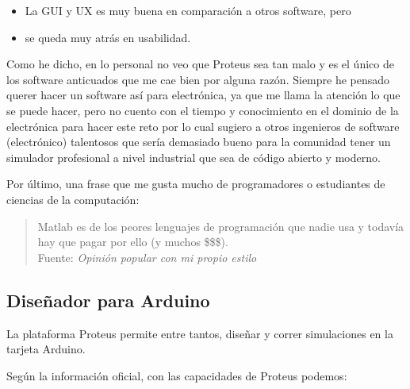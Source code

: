 \documentclass{article}
\begin{document}
\begin{itemize}
        \item La GUI y UX es muy buena en comparación a otros software, pero
        \item se queda muy atrás en usabilidad.
    \end{itemize}

    Como he dicho, en lo personal no veo que Proteus sea tan malo y es el
    único de los software anticuados que me cae bien por alguna razón.
    Siempre he pensado querer hacer un software así para electrónica, ya que
    me llama la atención lo que se puede hacer, pero no cuento con el tiempo y
    conocimiento en el dominio de la electrónica para hacer este reto por lo
    cual sugiero a otros ingenieros de software (electrónico) talentosos que
    sería demasiado bueno para la comunidad tener un simulador profesional a
    nivel industrial que sea de código abierto y moderno.

    \bigbreak

    Por último, una frase que me gusta mucho de programadores o estudiantes
    de ciencias de la computación:

    \begin{quote}
        Matlab es de los peores lenguajes de programación que nadie usa y
        todavía hay que pagar por ello (y muchos \$\$\$).\\ \footnotesize
        Fuente: \textit{Opinión popular con mi propio estilo}
    \end{quote}

    \subsection{Diseñador para Arduino}\label{subsec:diseñador-para-arduino}

    La plataforma Proteus permite entre tantos, diseñar y correr simulaciones
    en la tarjeta Arduino.

    \bigbreak

    Según la información oficial, con las capacidades de Proteus podemos:
\end{document}
